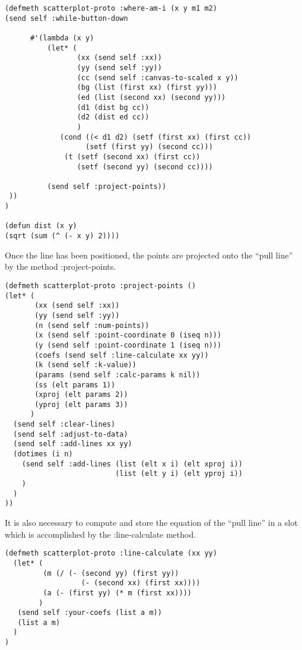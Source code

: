 \documentclass[11pt]{report}
\begin{document}
\begin{verbatim}
(defmeth scatterplot-proto :where-am-i (x y m1 m2)
(send self :while-button-down

      #'(lambda (x y)
          (let* (
                 (xx (send self :xx))
                 (yy (send self :yy))
                 (cc (send self :canvas-to-scaled x y))
                 (bg (list (first xx) (first yy)))
                 (ed (list (second xx) (second yy)))
                 (d1 (dist bg cc))
                 (d2 (dist ed cc))
                 )
             (cond ((< d1 d2) (setf (first xx) (first cc))
                   (setf (first yy) (second cc)))
              (t (setf (second xx) (first cc))
                 (setf (second yy) (second cc))))

          (send self :project-points))
 ))
)

(defun dist (x y)
(sqrt (sum (^ (- x y) 2))))
\end{verbatim}

Once the line has been positioned, the points are projected onto the
``pull line'' by the method :project-points.
   
\begin{verbatim}
(defmeth scatterplot-proto :project-points ()
(let* (
       (xx (send self :xx))
       (yy (send self :yy))
       (n (send self :num-points))
       (x (send self :point-coordinate 0 (iseq n)))
       (y (send self :point-coordinate 1 (iseq n)))
       (coefs (send self :line-calculate xx yy))
       (k (send self :k-value))
       (params (send self :calc-params k nil))
       (ss (elt params 1))
       (xproj (elt params 2))
       (yproj (elt params 3))
      )
  (send self :clear-lines)
  (send self :adjust-to-data)
  (send self :add-lines xx yy)
  (dotimes (i n) 
    (send self :add-lines (list (elt x i) (elt xproj i)) 
                          (list (elt y i) (elt yproj i))
    )
  )
))
\end{verbatim}

It is also necessary to compute and store the equation of the ``pull line'' 
in a slot which is accomplished by the :line-calculate method.
 
\begin{verbatim}
(defmeth scatterplot-proto :line-calculate (xx yy)
  (let* (
         (m (/ (- (second yy) (first yy)) 
                  (- (second xx) (first xx))))
         (a (- (first yy) (* m (first xx))))
        )
   (send self :your-coefs (list a m))
   (list a m)
  )
)
\end{verbatim}
\end{document}
